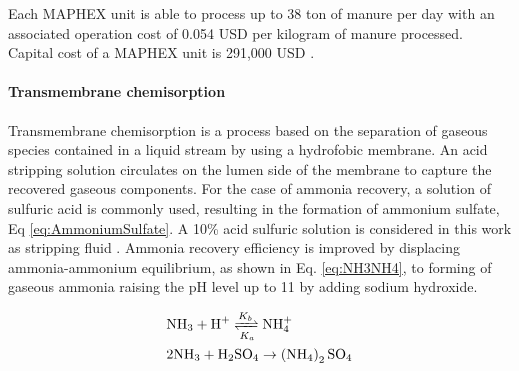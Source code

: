 \begin{refsection}[referencesCh6]

Each MAPHEX unit is able to process up to 38 ton of manure per day
with an associated operation cost of 
0.054 USD per kilogram of manure processed. Capital cost of a MAPHEX unit is 291,000 USD \citep{church_versatility_2018, church_novel_2016}.

\paragraph{\textbf{Transmembrane chemisorption}}

Transmembrane chemisorption is a process based on the separation of gaseous species contained in a liquid stream by using a hydrofobic membrane. An acid stripping solution circulates on the lumen side of the membrane to capture the recovered gaseous components. For the case of ammonia recovery, a solution of sulfuric acid is commonly used, resulting in the formation of ammonium sulfate, Eq \ref{eq:AmmoniumSulfate}. A 10\% acid sulfuric solution is considered in this work as stripping fluid \citep{darestani2017hollow}. Ammonia recovery efficiency is improved by  displacing ammonia-ammonium equilibrium, as shown in Eq. \ref{eq:NH3NH4}, to forming of gaseous ammonia raising the pH level up to 11 by adding sodium hydroxide.

\begin{align}
	& \text{NH}_3 + \text{H}^+ \xrightleftharpoons[K_a]{K_b} \text{NH}_4^+\label{eq:NH3NH4}
	\\
	& 2\text{NH}_3 + \text{H}_2\text{SO}_4 \rightarrow \left(\text{NH}_4\right)_{2}\text{SO}_4  \label{eq:AmmoniumSulfate}  %
\end{align}


\end{refsection}
